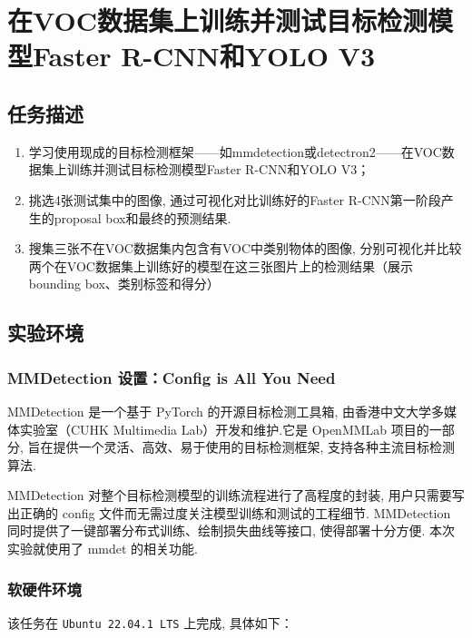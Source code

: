 \documentclass[notitlepage,cs4size,punct,oneside]{ctexrep}
\numberwithin{equation}{chapter}
\theoremstyle{mystyle}
\begin{document}
\chapter{在VOC数据集上训练并测试目标检测模型Faster R-CNN和YOLO V3}
\section{任务描述}
\begin{enumerate}
    \item 学习使用现成的目标检测框架——如mmdetection或detectron2——在VOC数据集上训练并测试目标检测模型Faster R-CNN和YOLO V3；
    \item 挑选4张测试集中的图像, 通过可视化对比训练好的Faster R-CNN第一阶段产生的proposal box和最终的预测结果.
    \item 搜集三张不在VOC数据集内包含有VOC中类别物体的图像, 分别可视化并比较两个在VOC数据集上训练好的模型在这三张图片上的检测结果（展示bounding box、类别标签和得分）
\end{enumerate}


\section{实验环境}
\subsection{MMDetection 设置：Config is All You Need}
MMDetection 是一个基于 PyTorch 的开源目标检测工具箱, 由香港中文大学多媒体实验室（CUHK Multimedia Lab）开发和维护.它是 OpenMMLab 项目的一部分, 旨在提供一个灵活、高效、易于使用的目标检测框架, 支持各种主流目标检测算法.

MMDetection 对整个目标检测模型的训练流程进行了高程度的封装, 用户只需要写出正确的 config 文件而无需过度关注模型训练和测试的工程细节. MMDetection 同时提供了一键部署分布式训练、绘制损失曲线等接口, 使得部署十分方便. 本次实验就使用了 mmdet 的相关功能.
\subsection{软硬件环境}

该任务在 \lstinline|Ubuntu 22.04.1 LTS| 上完成, 具体如下：
\end{document}
